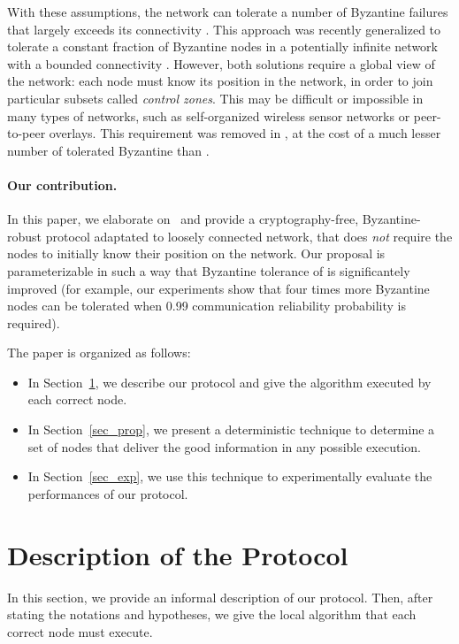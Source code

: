 \documentclass[a4paper,11pt]{article}
\begin{document}
With these assumptions, the network can tolerate a number of Byzantine failures that largely exceeds its connectivity \cite{CtrZ}.
This approach was recently generalized to tolerate a constant fraction of Byzantine nodes in a potentially infinite network with a bounded connectivity \cite{Scalbyz}.
However, both solutions require a global view of the network: each node must know its position in the network, in order to join particular subsets called \emph{control zones}.
This may be difficult or impossible in many types of networks, such as self-organized wireless sensor networks or peer-to-peer overlays.
This requirement was removed in \cite{Trig}, at the cost of a much lesser number of tolerated Byzantine than \cite{CtrZ,Scalbyz}.

\paragraph{Our contribution.}

In this paper, we elaborate on~\cite{Trig} and provide a cryptography-free, Byzantine-robust protocol adaptated to loosely connected network, that does \emph{not} require the nodes to initially know their position on the network. Our proposal is parameterizable in such a way that Byzantine tolerance of \cite{Trig} is significantely improved (for example, our experiments show that four times more Byzantine nodes can be tolerated when 0.99 communication reliability probability is required).

The paper is organized as follows:
\begin{itemize}
\item In Section~\ref{sec_desc}, we describe our protocol and give the algorithm executed by each correct node.
\item In Section~\ref{sec_prop}, we present a deterministic technique to determine a set of nodes that deliver the good information in any possible execution.
\item In Section~\ref{sec_exp}, we use this technique to experimentally evaluate the performances of our protocol.
\end{itemize}

\section{Description of the Protocol}
\label{sec_desc}

In this section, we provide an informal description of our protocol. Then, after stating the notations and hypotheses, we give the local algorithm that each correct node must execute.
\end{document}
